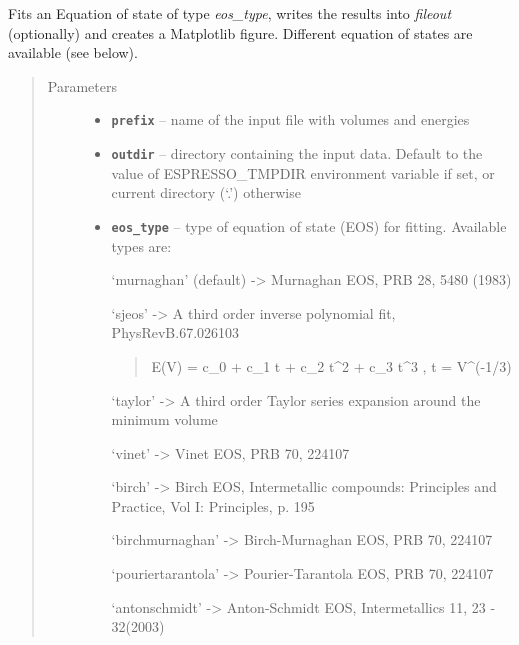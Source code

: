 \documentclass[letterpaper,10pt,english]{sphinxmanual}
\begin{document}

\begin{fulllineitems}
\label{postqe:postqe.api.compute_eos}
Fits an Equation of state of type \emph{eos\_type}, writes the results into \emph{fileout} (optionally) and creates a Matplotlib
figure. Different equation of states are available (see below).
\begin{quote}\begin{description}
\item[{Parameters}] \leavevmode\begin{itemize}
\item {} 
\textbf{\texttt{prefix}} -- name of the input file with volumes and energies

\item {} 
\textbf{\texttt{outdir}} -- directory containing the input data. Default to the value of
ESPRESSO\_TMPDIR environment variable if set, or current directory (`.') otherwise

\item {} 
\textbf{\texttt{eos\_type}} -- 
type of equation of state (EOS) for fitting. Available types are:

`murnaghan' (default) -\textgreater{} Murnaghan EOS, PRB 28, 5480 (1983)

`sjeos' -\textgreater{} A third order inverse polynomial fit, PhysRevB.67.026103
\begin{quote}

E(V) = c\_0 + c\_1 t + c\_2 t\textasciicircum{}2  + c\_3 t\textasciicircum{}3 ,  t = V\textasciicircum{}(-1/3)
\end{quote}

`taylor' -\textgreater{} A third order Taylor series expansion around the minimum volume

`vinet' -\textgreater{} Vinet EOS, PRB 70, 224107

`birch' -\textgreater{} Birch EOS, Intermetallic compounds: Principles and Practice, Vol I: Principles, p. 195

`birchmurnaghan' -\textgreater{} Birch-Murnaghan EOS, PRB 70, 224107

`pouriertarantola' -\textgreater{} Pourier-Tarantola EOS, PRB 70, 224107

`antonschmidt' -\textgreater{} Anton-Schmidt EOS, Intermetallics 11, 23 - 32(2003)


\end{itemize}
\end{description}
\end{quote}
\end{fulllineitems}
\end{document}
